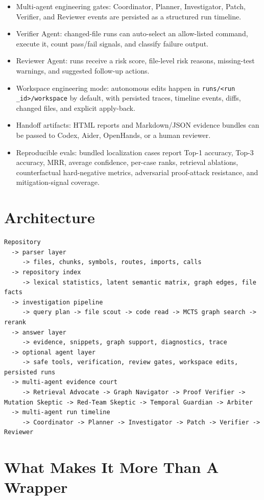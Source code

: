\documentclass[UTF8,12pt,openany]{ctexbook}
\begin{document}
\begin{itemize}
\item Multi-agent engineering gates: Coordinator, Planner, Investigator, Patch, Verifier, and Reviewer events are persisted as a structured run timeline.
\item Verifier Agent: changed-file runs can auto-select an allow-listed command, execute it, count pass/fail signals, and classify failure output.
\item Reviewer Agent: runs receive a risk score, file-level risk reasons, missing-test warnings, and suggested follow-up actions.
\item Workspace engineering mode: autonomous edits happen in \texttt{runs/<run\\_id>/workspace} by default, with persisted traces, timeline events, diffs, changed files, and explicit apply-back.
\item Handoff artifacts: HTML reports and Markdown/JSON evidence bundles can be passed to Codex, Aider, OpenHands, or a human reviewer.
\item Reproducible evals: bundled localization cases report Top-1 accuracy, Top-3 accuracy, MRR, average confidence, per-case ranks, retrieval ablations, counterfactual hard-negative metrics, adversarial proof-attack resistance, and mitigation-signal coverage.
\end{itemize}

\section{Architecture}

\begin{lstlisting}
Repository
  -> parser layer
     -> files, chunks, symbols, routes, imports, calls
  -> repository index
     -> lexical statistics, latent semantic matrix, graph edges, file facts
  -> investigation pipeline
     -> query plan -> file scout -> code read -> MCTS graph search -> rerank
  -> answer layer
     -> evidence, snippets, graph support, diagnostics, trace
  -> optional agent layer
     -> safe tools, verification, review gates, workspace edits, persisted runs
  -> multi-agent evidence court
     -> Retrieval Advocate -> Graph Navigator -> Proof Verifier -> Mutation Skeptic -> Red-Team Skeptic -> Temporal Guardian -> Arbiter
  -> multi-agent run timeline
     -> Coordinator -> Planner -> Investigator -> Patch -> Verifier -> Reviewer
\end{lstlisting}

\section{What Makes It More Than A Wrapper}
\end{document}
